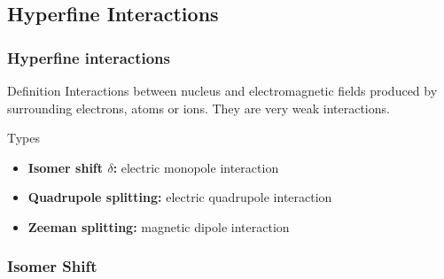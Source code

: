 \subsection{Hyperfine Interactions}
	\begin{frame}
		\frametitle{Hyperfine interactions}
		\begin{block}{Definition}
			Interactions between nucleus and electromagnetic fields produced by surrounding electrons, atoms or ions. They are very weak interactions.
		\end{block}
	
		\begin{block}{Types}
			\begin{itemize}
				\item \textbf{Isomer shift $\delta$:} electric monopole interaction
				\item \textbf{Quadrupole splitting:} electric quadrupole interaction
				\item \textbf{Zeeman splitting:} magnetic dipole interaction
			\end{itemize}
		\end{block}
	\end{frame}

\subsubsection{Isomer Shift}
	

